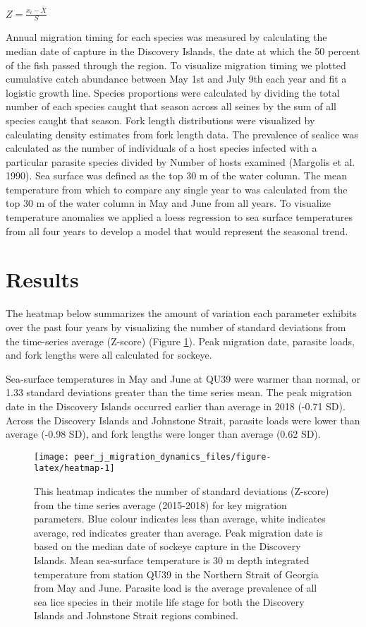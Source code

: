 \documentclass[fleqn,10pt]{wlpeerj} %
\begin{document}
\(Z = {\frac{x_i - \bar X}{{S}}}\)

Annual migration timing for each species was measured by calculating the
median date of capture in the Discovery Islands, the date at which the
50 percent of the fish passed through the region. To visualize migration
timing we plotted cumulative catch abundance between May 1st and July
9th each year and fit a logistic growth line. Species proportions were
calculated by dividing the total number of each species caught that
season across all seines by the sum of all species caught that season.
Fork length distributions were visualized by calculating density
estimates from fork length data. The prevalence of sealice was
calculated as the number of individuals of a host species infected with
a particular parasite species divided by Number of hosts examined
(Margolis et al. 1990). Sea surface was defined as the top 30 m of the
water column. The mean temperature from which to compare any single year
to was calculated from the top 30 m of the water column in May and June
from all years. To visualize temperature anomalies we applied a loess
regression to sea surface temperatures from all four years to develop a
model that would represent the seasonal trend.

\section*{Results}\label{results}

The heatmap below summarizes the amount of variation each parameter
exhibits over the past four years by visualizing the number of standard
deviations from the time-series average (Z-score) (Figure
\ref{fig:heatmap}). Peak migration date, parasite loads, and fork
lengths were all calculated for sockeye.

Sea-surface temperatures in May and June at QU39 were warmer than
normal, or 1.33 standard deviations greater than the time series mean.
The peak migration date in the Discovery Islands occurred earlier than
average in 2018 (-0.71 SD). Across the Discovery Islands and Johnstone
Strait, parasite loads were lower than average (-0.98 SD), and fork
lengths were longer than average (0.62 SD).

\begin{figure}[H]
\texttt{[image: peer\_j\_migration\_dynamics\_files/figure-latex/heatmap-1]} \caption{This heatmap indicates the number of standard deviations (Z-score) from the time series average (2015-2018) for key migration parameters. Blue colour indicates less than average, white indicates average, red indicates greater than average. Peak migration date is based on the median date of sockeye capture in the Discovery Islands.  Mean sea-surface temperature is 30 m depth integrated temperature from station QU39 in the Northern Strait of Georgia from May and June. Parasite load is the average prevalence of all sea lice species in their motile life stage for both the Discovery Islands and Johnstone Strait regions combined.}\label{fig:heatmap}
\end{figure}
\end{document}
